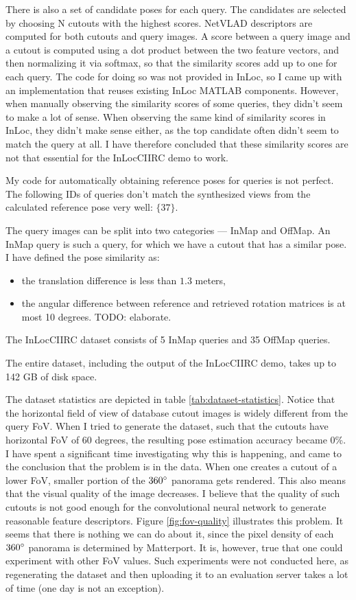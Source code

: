 \documentclass[twoside]{ctuthesis}
\theoremstyle{plain}
\theoremstyle{definition}
\theoremstyle{note}
\begin{document}
There is also a set of candidate poses for each query. The candidates are selected by choosing N cutouts with the highest scores. NetVLAD \cite{Arandjelovic16} descriptors are computed for both cutouts and query images. A score between a query image and a cutout is computed using a dot product between the two feature vectors, and then normalizing it via softmax, so that the similarity scores add up to one for each query. The code for doing so was not provided in InLoc, so I came up with an implementation that reuses existing InLoc MATLAB components. However, when manually observing the similarity scores of some queries, they didn't seem to make a lot of sense. When observing the same kind of similarity scores in InLoc, they didn't make sense either, as the top candidate often didn't seem to match the query at all. I have therefore concluded that these similarity scores are not that essential for the InLocCIIRC demo to work.

My code for automatically obtaining reference poses for queries is not perfect. The following IDs of queries don't match the synthesized views from the calculated reference pose very well: $\{37\}$.

The query images can be split into two categories --- InMap and OffMap. An InMap query is such a query, for which we have a cutout that has a similar pose. I have defined the pose similarity as:

\begin{itemize}
	\item the translation difference is less than $1.3$ meters,
	\item the angular difference between reference and retrieved rotation matrices is at most 10 degrees. TODO: elaborate.
\end{itemize}

The InLocCIIRC dataset consists of 5 InMap queries and 35 OffMap queries.

The entire dataset, including the output of the InLocCIIRC demo, takes up to 142 GB of disk space.

The dataset statistics are depicted in table \ref{tab:dataset-statistics}. Notice that the horizontal field of view of database cutout images is widely different from the query FoV. When I tried to generate the dataset, such that the cutouts have horizontal FoV of 60 degrees, the resulting pose estimation accuracy became 0\%. I have spent a significant time investigating why this is happening, and came to the conclusion that the problem is in the data. When one creates a cutout of a lower FoV, smaller portion of the $360\degree$ panorama gets rendered. This also means that the visual quality of the image decreases. I believe that the quality of such cutouts is not good enough for the convolutional neural network to generate reasonable feature descriptors. Figure \ref{fig:fov-quality} illustrates this problem. It seems that there is nothing we can do about it, since the pixel density of each $360\degree$ panorama is determined by Matterport. It is, however, true that one could experiment with other FoV values. Such experiments were not conducted here, as regenerating the dataset and then uploading it to an evaluation server takes a lot of time (one day is not an exception).
\end{document}
